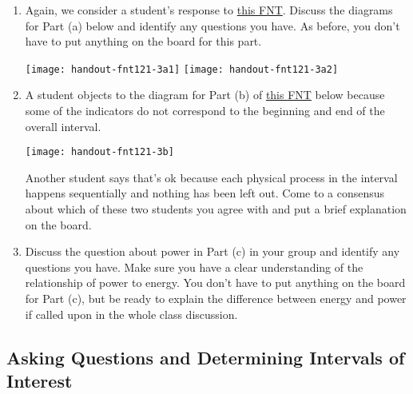 \begin{fnt}
	
\end{fnt}


\begin{enumerate}[1.]

	\item Again, we consider a student's response to \hyperref[fnt1.2.1-3]{this FNT}. Discuss the diagrams for Part (a) below and identify any questions you have. As before, you don't have to put anything on the board for this part.
	
		\texttt{[image: handout-fnt121-3a1]}
		\;
		\texttt{[image: handout-fnt121-3a2]}
	
	\item A student objects to the diagram for Part (b) of \hyperref[fnt1.2.1-3]{this FNT} below because some of the indicators do not correspond to the beginning and end of the overall interval.
	
		\texttt{[image: handout-fnt121-3b]}
		
		Another student says that's ok because each physical process in the interval happens sequentially and nothing has been left out. Come to a consensus about which of these two students you agree with and put a brief explanation on the board.
	
	\item Discuss the question about power in Part (c) in your group and identify any questions you have. Make sure you have a clear understanding of the relationship of power to energy. You don't have to put anything on the board for Part (c), but be ready to explain the difference between energy and power if called upon in the whole class discussion.

\WCD

\end{enumerate}

\subsection{Asking Questions and Determining Intervals of Interest}
\label{act1.2.2D}

\begin{fnt}
	
\end{fnt}


